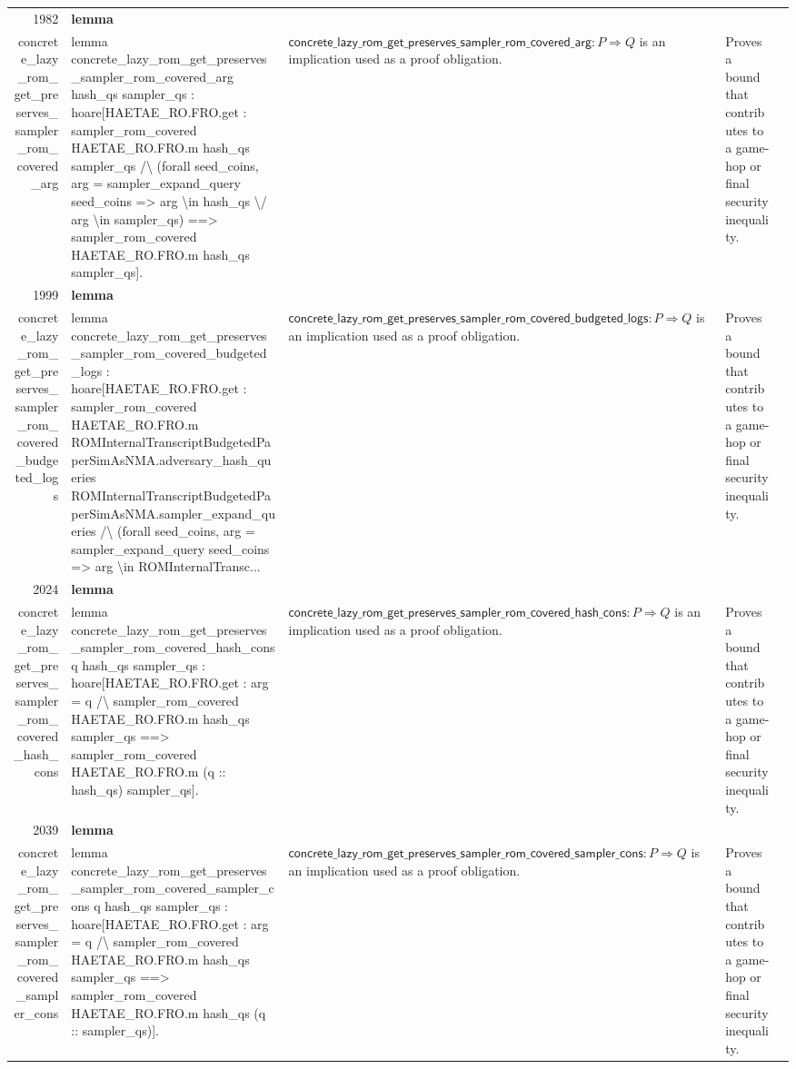 \documentclass[10pt]{article}
\newcommand{\ec}[1]{\begingroup\ttfamily\scriptsize #1\endgroup}
\begin{document}
\begin{longtable}{r L{0.17\textwidth} L{0.26\textwidth} L{0.27\textwidth} L{0.20\textwidth}}
1982 & \textbf{lemma}\\\ec{concrete\_lazy\_rom\_get\_preserves\_sampler\_rom\_covered\_arg} & \ec{lemma concrete\_lazy\_rom\_get\_preserves\_sampler\_rom\_covered\_arg hash\_qs sampler\_qs : hoare[HAETAE\_RO.FRO.get : sampler\_rom\_covered HAETAE\_RO.FRO.m hash\_qs sampler\_qs /\textbackslash{} (forall seed\_coins, arg = sampler\_expand\_query seed\_coins => arg \textbackslash{}in hash\_qs \textbackslash{}/ arg \textbackslash{}in sampler\_qs) ==> sampler\_rom\_covered HAETAE\_RO.FRO.m hash\_qs sampler\_qs].} & \(\mathsf{concrete\_lazy\_rom\_get\_preserves\_sampler\_rom\_covered\_arg} : P \Rightarrow Q\) is an implication used as a proof obligation. & Proves a bound that contributes to a game-hop or final security inequality. \\
1999 & \textbf{lemma}\\\ec{concrete\_lazy\_rom\_get\_preserves\_sampler\_rom\_covered\_budgeted\_logs} & \ec{lemma concrete\_lazy\_rom\_get\_preserves\_sampler\_rom\_covered\_budgeted\_logs : hoare[HAETAE\_RO.FRO.get : sampler\_rom\_covered HAETAE\_RO.FRO.m ROMInternalTranscriptBudgetedPaperSimAsNMA.adversary\_hash\_queries ROMInternalTranscriptBudgetedPaperSimAsNMA.sampler\_expand\_queries /\textbackslash{} (forall seed\_coins, arg = sampler\_expand\_query seed\_coins => arg \textbackslash{}in ROMInternalTransc...} & \(\mathsf{concrete\_lazy\_rom\_get\_preserves\_sampler\_rom\_covered\_budgeted\_logs} : P \Rightarrow Q\) is an implication used as a proof obligation. & Proves a bound that contributes to a game-hop or final security inequality. \\
2024 & \textbf{lemma}\\\ec{concrete\_lazy\_rom\_get\_preserves\_sampler\_rom\_covered\_hash\_cons} & \ec{lemma concrete\_lazy\_rom\_get\_preserves\_sampler\_rom\_covered\_hash\_cons q hash\_qs sampler\_qs : hoare[HAETAE\_RO.FRO.get : arg = q /\textbackslash{} sampler\_rom\_covered HAETAE\_RO.FRO.m hash\_qs sampler\_qs ==> sampler\_rom\_covered HAETAE\_RO.FRO.m (q :: hash\_qs) sampler\_qs].} & \(\mathsf{concrete\_lazy\_rom\_get\_preserves\_sampler\_rom\_covered\_hash\_cons} : P \Rightarrow Q\) is an implication used as a proof obligation. & Proves a bound that contributes to a game-hop or final security inequality. \\
2039 & \textbf{lemma}\\\ec{concrete\_lazy\_rom\_get\_preserves\_sampler\_rom\_covered\_sampler\_cons} & \ec{lemma concrete\_lazy\_rom\_get\_preserves\_sampler\_rom\_covered\_sampler\_cons q hash\_qs sampler\_qs : hoare[HAETAE\_RO.FRO.get : arg = q /\textbackslash{} sampler\_rom\_covered HAETAE\_RO.FRO.m hash\_qs sampler\_qs ==> sampler\_rom\_covered HAETAE\_RO.FRO.m hash\_qs (q :: sampler\_qs)].} & \(\mathsf{concrete\_lazy\_rom\_get\_preserves\_sampler\_rom\_covered\_sampler\_cons} : P \Rightarrow Q\) is an implication used as a proof obligation. & Proves a bound that contributes to a game-hop or final security inequality. \\

\end{longtable}
\end{document}
